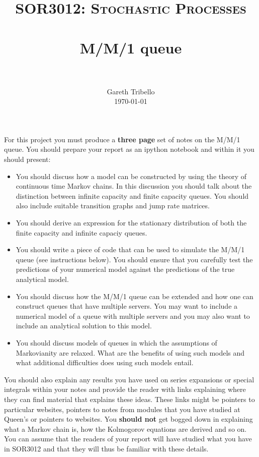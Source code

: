 \documentclass[paper=a4, fontsize=11pt]{scrartcl}
\title{\usefont{OT1}{bch}{b}{n} \normalfont \normalsize \textsc{SOR3012:
Stochastic Processes} \\ [25pt] \horrule{0.5pt} \\[0.4cm] 
\huge M/M/1 queue \\
\horrule{2pt} \\[0.25cm]
}
\author{ \normalfont
\normalsize
        Gareth Tribello \\[-3pt] \normalsize
        \today
}
\date{}
\numberwithin{equation}{section}
\numberwithin{figure}{section}
\numberwithin{table}{section}
\begin{document}
\maketitle

For this project you must produce a {\bfseries three page} set of notes on the M/M/1 queue.  You should prepare your report as an ipython notebook and within it you should present:

\begin{itemize}
\item You should discuss how a model can be constructed by using the theory of continuous time Markov chains.  In this discussion you should talk about the distinction between infinite 
capacity and finite capacity queues.  You should also include suitable transition graphs and jump rate matrices.

\item You should derive an expression for the stationary distribution of both the finite capacity and infinite capaciy queues.

\item You should write a piece of code that can be used to simulate the M/M/1 queue (see instructions below).  You should ensure that you carefully test the predictions of your numerical
model against the predictions of the true analytical model.  

\item You should discuss how the M/M/1 queue can be extended and how one can construct queues that have multiple servers.  You may want to include a numerical model of a queue with multiple servers
and you may also want to include an analytical solution to this model.

\item You should discuss models of queues in which the assumptions of Markovianity are relaxed.  What are the benefits of using such models and what additional difficulties does using such models entail.

\end{itemize}

You should also explain any results you have used on series expansions or special integrals within your notes and provide the reader with links explaining where they can find material that explains 
these ideas.  These links might be pointers to particular websites, pointers to notes from modules that you have studied at Queen's or pointers to websites.  You {\bfseries should not} get bogged down in 
explaining what a Markov chain is, how the Kolmogorov equations are derived and so on. You can assume that the readers of your report will have studied what you have in SOR3012 and that they will thus
be familiar with these details.
\end{document}
